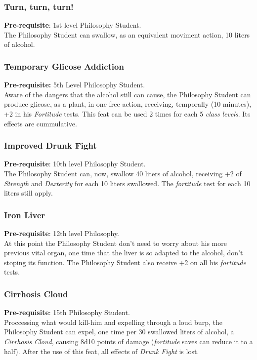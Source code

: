 \documentclass[ letterpaper,12pt]{article}
\begin{document}
\subsubsection{Turn, turn, turn!}
 {\bf Pre-requisite}: 1st level Philosophy Student.\\
The Philosophy Student can swallow, as an equivalent moviment action, 10 liters of alcohol.

\subsubsection{Temporary Glicose Addiction}
 {\bf Pre-requisite:} 5th Level Philosophy Student.\\
 Aware of the dangers that the alcohol still can cause, the Philosophy Student can produce glicose, as a plant, in one free action, receiving, temporally (10 minutes), +2 in his {\it Fortitude} tests. This feat can be used 2 times for each 5 {\it class levels}. Its effects are cummulative.

\subsubsection{Improved Drunk Fight}
 {\bf Pre-requisite}: 10th level Philosophy Student.\\
 The Philosophy Student can, now, swallow 40 liters of alcohol, receiving +2 of {\it Strength} and {\it Dexterity} for each 10 liters swallowed. The {\it fortitude} test for each 10 liters still apply.

\subsubsection{Iron Liver}
 {\bf Pre-requisite}: 12th level Philosophy.\\
 At this point the Philosophy Student don't need to worry about his more previous vital organ, one time that the liver is so adapted to the alcohol, don't stoping its function. The Philosophy Student also receive +2 on all his {\it fortitude} tests.

\subsubsection{Cirrhosis Cloud}
 {\bf Pre-requisite}: 15th Philosophy Student.\\
Proccessing what would kill-him and expelling through a loud burp, the Philosophy Student can expel, one time per 30 swallowed liters of alcohol, a {\it Cirrhosis Cloud}, causing 8d10 points of damage ({\it fortitude} saves can reduce it to a half). After the use of this feat, all effects of {\it Drunk Fight} is lost.
\end{document}
